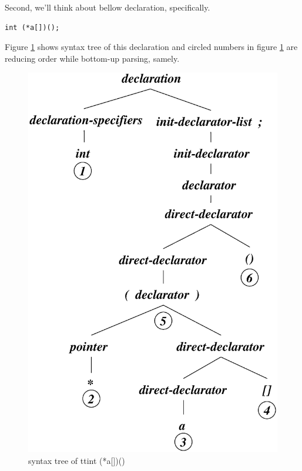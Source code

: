 Second, we'll think about bellow declaration, specifically.
\begin{verbatim}
int (*a[])();
\end{verbatim}
Figure \ref{decl_e003} shows syntax tree of this declaration
and circled numbers in figure \ref{decl_e003} are reducing order
while bottom-up parsing, samely.
\begin{figure}[htbp]
\begin{center}
\includegraphics[width=1.0125\linewidth,height=1.4175\linewidth]{decl003.eps}
\caption{syntax tree of {tt{int (*a[])()}}}
\label{decl_e003}
\end{center}
\end{figure}
